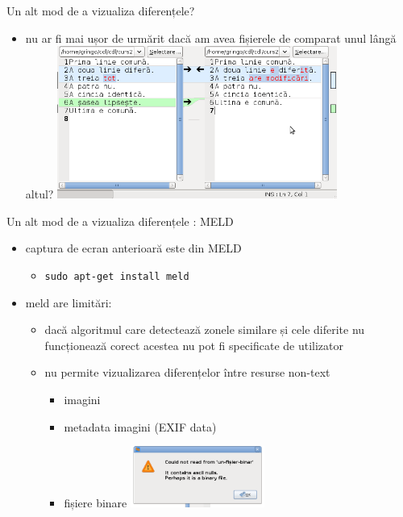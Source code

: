\documentclass{beamer}
\begin{document}
\begin{frame}{Un alt mod de a vizualiza diferențele?}
  \begin{itemize}
  \item nu ar fi mai ușor de urmărit dacă am avea fișierele de comparat unul lângă altul?
    \pause
    \includegraphics[height=5cm]{code/screenshot-meld.png}%
  \end{itemize}
\end{frame}

\begin{frame}{Un alt mod de a vizualiza diferențele : MELD}
  \begin{itemize}[<+->]
  \item captura de ecran anterioară este din MELD
    \begin{itemize}
      \item \texttt{sudo apt-get install meld}
    \end{itemize}
  \item meld are limitări:
    \begin{itemize}
      \item dacă algoritmul care detectează zonele similare și cele diferite nu 
        funcționează corect acestea nu pot fi specificate de utilizator
      \item nu permite vizualizarea diferențelor între resurse non-text
        \begin{itemize}
        \item imagini
        \item metadata imagini (EXIF data)
        \item fișiere binare
          \includegraphics[height=2cm]{code/screenshot-meld-binary-error.png}
        \end{itemize}
    \end{itemize}
  \end{itemize}
\end{frame}
\end{document}
